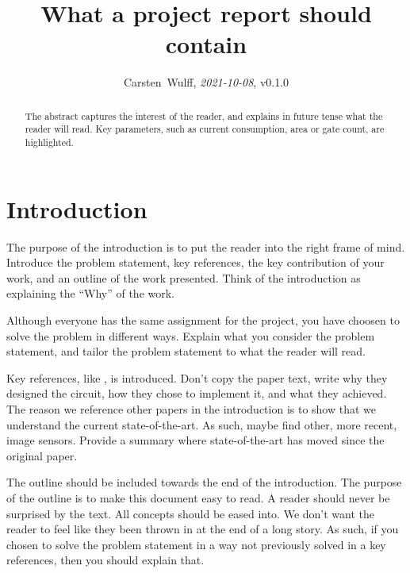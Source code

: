 \documentclass[paper,10pt,a4paper]{IEEEtran}
\begin{document}

\title{What a project report should contain}
\author{Carsten~Wulff, \textit{2021-10-08}, v0.1.0 }
\maketitle

\begin{abstract}
  The abstract captures the interest of the reader, and explains in future tense
  what the reader will read. Key parameters, such as current consumption, area
  or gate count, are highlighted.
\end{abstract}

\section{Introduction}

The purpose of the introduction is to put the reader into the right frame of
mind. Introduce the problem statement, key references, the key contribution of
your work, and an outline of the
work presented. Think of the introduction
as explaining the ``Why'' of the work.

Although everyone has the same assignment for the project, you have choosen to
solve the problem in different ways. Explain what you consider the problem
statement, and tailor the problem statement to what the reader will read.

Key references, like \cite{klein01}, is introduced. Don't copy the paper text, write why they designed the circuit, how they chose to implement it, and
what they achieved. The reason we reference other papers in the introduction is
to show that we understand the current state-of-the-art. As such, maybe find
other, more recent, image sensors. Provide a summary where
state-of-the-art has moved since the original paper.

The outline should be included towards the end of the
introduction. The purpose of the outline is to make this document easy to read. A reader should
never be surprised by the text. All concepts should be eased into. We don't want
the reader to feel like they been thrown in at the end of a long story. As such,
if you chosen to solve the problem statement in a way not previously solved in a
key references, then you should explain that.
\end{document}
